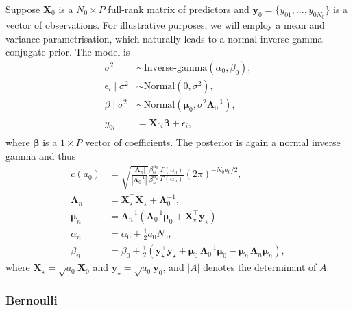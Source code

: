 \documentclass[a4paper, notitlepage, 11pt]{article}
\begin{document}
Suppose $\boldsymbol X_0$ is a $N_0 \times P$ full-rank matrix of predictors and $\boldsymbol y_0 = \{y_{01}, \ldots, y_{0N_0} \}$ is a vector of observations.
For illustrative purposes, we will employ a mean and variance parametrisation, which naturally leads to a normal inverse-gamma conjugate prior.
The model is 
\begin{align*}
 \sigma^2 &\sim \text{Inverse-gamma}(\alpha_0, \beta_0),\\
 \epsilon_i \mid \sigma^2  &\sim \text{Normal}(0, \sigma^2), \\
 \beta \mid \sigma^2 &\sim \text{Normal}(\boldsymbol \mu_0, \sigma^2\boldsymbol\Lambda_0^{-1}),\\
 y_{0i} &= \boldsymbol X_{0i}^\top \boldsymbol\beta + \epsilon_i, \\
\end{align*} 
where $\boldsymbol\beta$ is a $ 1 \times P$ vector of coefficients.
The posterior is again a normal inverse gamma and thus
\begin{align}
 \label{eq:cA0_regression}
c(a_0) &= \sqrt{\frac{|\boldsymbol\Lambda_n|}{|\boldsymbol\Lambda_0^{-1}|}} \frac{\beta_0^{\alpha_0}}{\beta_n^{\alpha_n}}\frac{\Gamma(\alpha_0)}{\Gamma(\alpha_n)}  (2\pi)^{-N_0 a_0/2},\\
\nonumber
\boldsymbol\Lambda_n &= \boldsymbol X_{\star}^\top\boldsymbol X_{\star} + \boldsymbol \Lambda_0^{-1}, \\
\nonumber
\boldsymbol\mu_n &= \boldsymbol\Lambda_n^{-1}\left(\boldsymbol\Lambda_0^{-1}\boldsymbol\mu_0 + \boldsymbol X_{\star}^\top\boldsymbol y_{\star} \right)  \\
\nonumber
\alpha_n &= \alpha_0 + \frac{1}{2}a_0N_0,\\
\nonumber
\beta_n &= \beta_0 + \frac{1}{2}\left( \boldsymbol y_{\star}^\top \boldsymbol y_{\star} + \boldsymbol \mu_0^\top \boldsymbol \Lambda_0^{-1} \boldsymbol \mu_0 - \boldsymbol\mu_n^\top \boldsymbol \Lambda_n \boldsymbol \mu_n  \right),
\end{align}
where $\boldsymbol X_{\star} = \sqrt{a_0} \boldsymbol X_0$ and $\boldsymbol y_{\star} = \sqrt{a_0} \boldsymbol y_0$, and $|A|$ denotes the determinant of $A$.

\subsubsection{Bernoulli}
\end{document}
